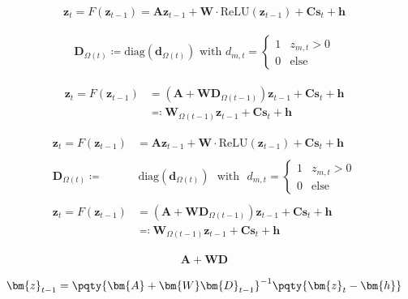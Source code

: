 \documentclass{article}
\theoremstyle{example}
\theoremstyle{plain}
\theoremstyle{definition}
\theoremstyle{remark}
\def\vd{{\bm{d}}}
\def\vh{{\bm{h}}}
\def\vs{{\bm{s}}}
\def\vz{{\bm{z}}}
\def\mA{{\bm{A}}}
\def\mC{{\bm{C}}}
\def\mD{{\bm{D}}}
\def\mW{{\bm{W}}}
\begin{document}
\newpage

\begin{align*}
    \vz_t = F(\vz_{t-1}) = \mA \vz_{t-1} + \mW \cdot \text{ReLU}(\vz_{t-1}) + \mC \vs_t + \vh
\end{align*}

\begin{align*}
    \mD_{\Omega(t)} \coloneq \text{diag}(\vd_{\Omega (t)}) \text{  with  } d_{m, t} = \begin{cases}
        1 & z_{m, t} >0\\
        0 & \text{else}
    \end{cases}
\end{align*}


\begin{align*}
    \vz_t = F(\vz_{t-1}) &= (\mA + \mW \mD_{\Omega(t-1)}) \vz_{t-1} + \mC \vs_t + \vh\\
    &\eqcolon \mW_{\Omega(t-1)} \vz_{t-1}+ \mC \vs_t + \vh
\end{align*}




\begin{align*}
    \vz_t = F(\vz_{t-1}) &= \mA \vz_{t-1} + \mW \cdot \text{ReLU}(\vz_{t-1}) + \mC \vs_t + \vh\\
\\
    \mD_{\Omega(t)} \coloneq &\,\text{diag}(\vd_{\Omega (t)}) \,\,\text{   with   } \,\,d_{m, t} = \begin{cases}
        1 & z_{m, t} >0\\
        0 & \text{else}
    \end{cases}\\
\\
    \vz_t = F(\vz_{t-1}) &= (\mA + \mW \mD_{\Omega(t-1)}) \vz_{t-1} + \mC \vs_t + \vh\\
    &\eqcolon \mW_{\Omega(t-1)} \vz_{t-1}+ \mC \vs_t + \vh
\end{align*}


\begin{align*}
    \mA + \mW\mD
\end{align*}


\begin{align*}
    \vz_{t-1} = \pqty{\mA + \mW\mD_{t-1}}^{-1}\pqty{\vz_{t}-\vh}
\end{align*}
\end{document}
